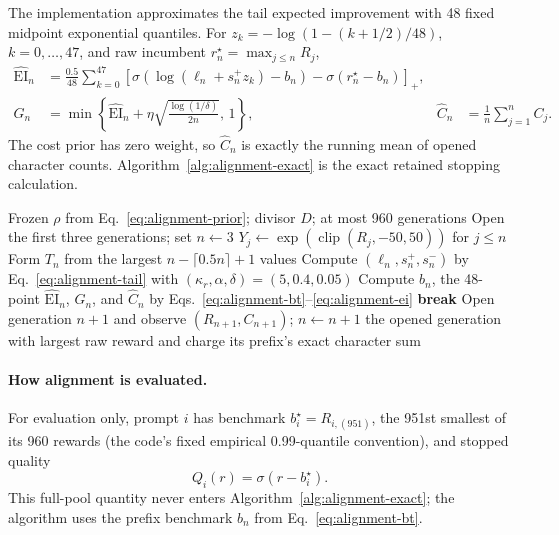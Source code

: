The implementation approximates the tail expected improvement with 48 fixed
midpoint exponential quantiles.  For
$z_k=-\log(1-(k+1/2)/48)$, $k=0,\ldots,47$, and raw incumbent
$r_n^\star=\max_{j\le n}R_j$,
\begin{align}
  \widehat{\mathrm{EI}}_n
  &=\frac{0.5}{48}\sum_{k=0}^{47}
    \left[
      \sigma\!\left(\log(\ell_n+s_n^+z_k)-b_n\right)
      -\sigma(r_n^\star-b_n)
    \right]_+,\\
  G_n&=\min\!\left\{
    \widehat{\mathrm{EI}}_n+\eta
    \sqrt{\frac{\log(1/\delta)}{2n}},\,1
  \right\},
  &\widehat C_n&=\frac{1}{n}\sum_{j=1}^{n}C_j.
  \label{eq:alignment-ei}
\end{align}
The cost prior has zero weight, so $\widehat C_n$ is exactly the running mean
of opened character counts.  Algorithm~\ref{alg:alignment-exact} is the exact
retained stopping calculation.

\begin{algorithm}[t]
\caption{Alignment: retained exponentiated-tail UCB--Pandora policy}
\label{alg:alignment-exact}
\begin{algorithmic}[1]
\Require Frozen $\rho$ from Eq.~\eqref{eq:alignment-prior}; divisor $D$;
         at most 960 generations
\State Open the first three generations; set $n\gets3$
  \State $Y_j\gets\exp(\operatorname{clip}(R_j,-50,50))$ for $j\le n$
  \State Form $T_n$ from the largest $n-\lceil0.5n\rceil+1$ values
  \State Compute $(\ell_n,s_n^+,s_n^-)$ by Eq.~\eqref{eq:alignment-tail}
        with $(\kappa_r,\alpha,\delta)=(5,0.4,0.05)$
  \State Compute $b_n$, the 48-point $\widehat{\mathrm{EI}}_n$, $G_n$, and
         $\widehat C_n$ by Eqs.~\eqref{eq:alignment-bt}--\eqref{eq:alignment-ei}
    \State \textbf{break}
  \EndIf
  \State Open generation $n+1$ and observe $(R_{n+1},C_{n+1})$;
         $n\gets n+1$
\EndWhile
\State \Return the opened generation with largest raw reward and charge its
       prefix's exact character sum
\end{algorithmic}
\end{algorithm}

\paragraph{How alignment is evaluated.}
For evaluation only, prompt $i$ has benchmark
$b_i^\star=R_{i,(951)}$, the 951st smallest of its 960 rewards (the code's
fixed empirical 0.99-quantile convention), and stopped quality
\begin{equation}
  Q_i(r)=\sigma(r-b_i^\star).
  \label{eq:alignment-eval-quality}
\end{equation}
This full-pool quantity never enters Algorithm~\ref{alg:alignment-exact}; the
algorithm uses the prefix benchmark $b_n$ from Eq.~\eqref{eq:alignment-bt}.

